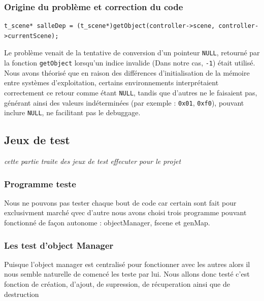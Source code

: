 \documentclass[a4paper,11pt]{article}
\begin{document}
\subsubsection{Origine du problème et correction du code}

\begin{lstlisting}[caption={Ligne fautive}, label=code:fautive]
t_scene* salleDep = (t_scene*)getObject(controller->scene, controller->currentScene);
\end{lstlisting}

Le problème venait de la tentative de conversion d'un pointeur \texttt{NULL}, retourné par la fonction \texttt{getObject} lorsqu'un indice invalide (Dans notre cas, \texttt{-1}) était utilisé.
Nous avons théorisé que en raison des différences d'initialisation de la mémoire entre systèmes d'exploitation, certains environnements interprétaient correctement ce retour comme étant \texttt{NULL}, tandis que d'autres ne le faisaient pas, générant ainsi des valeurs indéterminées (par exemple : \texttt{0x01}, \texttt{0xf0}), pouvant inclure \texttt{NULL}, ne facilitant pas le debuggage.

\newpage
\subsection{Jeux de test}
\textit{cette partie traite des jeux de test effecuter pour le projet}

\subsubsection{Programme teste}
Nous ne pouvons pas tester chaque bout de code car certain sont fait pour exclusivment marché qvec d'autre nous avons choisi trois programme pouvant fonctionné de façon autonome : objectManager, fscene et genMap.

\subsubsection{Les test d'object Manager}
Puisque l'object manager est centralisé pour fonctionner avec les autres alors il nous semble naturelle de comencé les teste par lui.
Nous allons donc testé c'est fonction de création, d'ajout, de supression, de récuperation ainsi que de destruction\\
\end{document}
